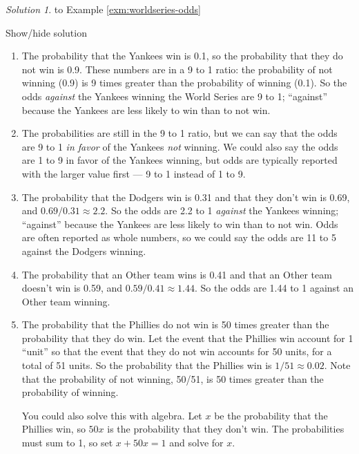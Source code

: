 \documentclass[
]{book}
\theoremstyle{definition}
\theoremstyle{definition}
\theoremstyle{definition}
\theoremstyle{remark}
\newtheorem*{solution}{Solution}
\begin{document}
\begin{solution}
{}
to Example \ref{exm:worldseries-odds}
\end{solution}

Show/hide solution

\begin{enumerate}
\def\labelenumi{\arabic{enumi}.}
\item
  The probability that the Yankees win is 0.1, so the probability that they do not win is 0.9. These numbers are in a 9 to 1 ratio: the probability of not winning (0.9) is 9 times greater than the probability of winning (0.1). So the odds \emph{against} the Yankees winning the World Series are 9 to 1; ``against'' because the Yankees are less likely to win than to not win.
\item
  The probabilities are still in the 9 to 1 ratio, but we can say that the odds are 9 to 1 \emph{in favor} of the Yankees \emph{not} winning. We could also say the odds are 1 to 9 in favor of the Yankees winning, but odds are typically reported with the larger value first --- 9 to 1 instead of 1 to 9.
\item
  The probability that the Dodgers win is 0.31 and that they don't win is 0.69, and \(0.69/0.31 \approx 2.2\). So the odds are 2.2 to 1 \emph{against} the Yankees winning; ``against'' because the Yankees are less likely to win than to not win. Odds are often reported as whole numbers, so we could say the odds are 11 to 5 against the Dodgers winning.\\
\item
  The probability that an Other team wins is 0.41 and that an Other team doesn't win is 0.59, and \(0.59/0.41 \approx 1.44\). So the odds are 1.44 to 1 against an Other team winning.
\item
  The probability that the Phillies do not win is 50 times greater than the probability that they do win. Let the event that the Phillies win account for 1 ``unit'' so that the event that they do not win accounts for 50 units, for a total of 51 units. So the probability that the Phillies win is \(1/51\approx 0.02\). Note that the probability of not winning, 50/51, is 50 times greater than the probability of winning.

  You could also solve this with algebra. Let \(x\) be the probability that the Phillies win, so \(50x\) is the probability that they don't win. The probabilities must sum to 1, so set \(x + 50x = 1\) and solve for \(x\).
\end{enumerate}
\end{document}
